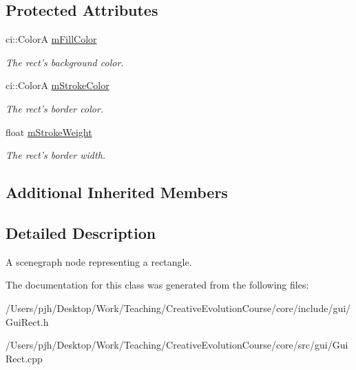 \subsection*{Protected Attributes}
\begin{DoxyCompactItemize}
\item 
\hypertarget{class_ui_rect_aa1fbc09431346eb5298329c9c631d555}{ci\-::\-Color\-A \hyperlink{class_ui_rect_aa1fbc09431346eb5298329c9c631d555}{m\-Fill\-Color}}\label{class_ui_rect_aa1fbc09431346eb5298329c9c631d555}

\begin{DoxyCompactList}\small\item\em The rect's background color. \end{DoxyCompactList}\item 
\hypertarget{class_ui_rect_a2166411996b369f1608da54e462ce154}{ci\-::\-Color\-A \hyperlink{class_ui_rect_a2166411996b369f1608da54e462ce154}{m\-Stroke\-Color}}\label{class_ui_rect_a2166411996b369f1608da54e462ce154}

\begin{DoxyCompactList}\small\item\em The rect's border color. \end{DoxyCompactList}\item 
\hypertarget{class_ui_rect_ade6271f1226c9a8557b161e239dcada7}{float \hyperlink{class_ui_rect_ade6271f1226c9a8557b161e239dcada7}{m\-Stroke\-Weight}}\label{class_ui_rect_ade6271f1226c9a8557b161e239dcada7}

\begin{DoxyCompactList}\small\item\em The rect's border width. \end{DoxyCompactList}\end{DoxyCompactItemize}
\subsection*{Additional Inherited Members}


\subsection{Detailed Description}
A scenegraph node representing a rectangle. 

The documentation for this class was generated from the following files\-:\begin{DoxyCompactItemize}
\item 
/\-Users/pjh/\-Desktop/\-Work/\-Teaching/\-Creative\-Evolution\-Course/core/include/gui/Gui\-Rect.\-h\item 
/\-Users/pjh/\-Desktop/\-Work/\-Teaching/\-Creative\-Evolution\-Course/core/src/gui/Gui\-Rect.\-cpp\end{DoxyCompactItemize}
